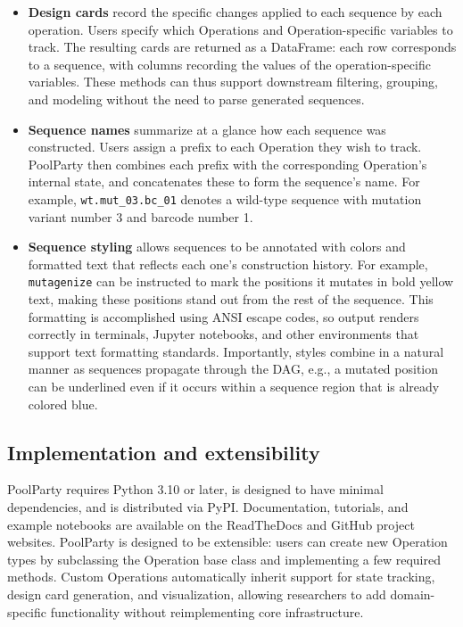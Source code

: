 \documentclass[unnumsec,webpdf,modern,large]{mam-authoring-template}%
\theoremstyle{thmstyleone}%
\theoremstyle{thmstyletwo}%
\theoremstyle{thmstylethree}%
\begin{document}
\begin{itemize}
\item \textbf{Design cards} record the specific changes applied to each sequence by each operation. Users specify which Operations and Operation-specific variables to track. The resulting cards are returned as a DataFrame: each row corresponds to a sequence, with columns recording the values of the operation-specific variables. These methods can thus support downstream filtering, grouping, and modeling without the need to parse generated sequences.

\item \textbf{Sequence names} summarize at a glance how each sequence was constructed. Users assign a prefix to each Operation they wish to track. PoolParty then combines each prefix with the corresponding Operation's internal state, and concatenates these to form the sequence's name. For example, \texttt{wt.mut\_03.bc\_01} denotes a wild-type sequence with mutation variant number 3 and barcode number 1.

\item \textbf{Sequence styling} allows sequences to be annotated with colors and formatted text that reflects each one's construction history. For example, \texttt{mutagenize} can be instructed to mark the positions it mutates in bold yellow text, making these positions stand out from the rest of the sequence. This formatting is accomplished using ANSI escape codes, so output renders correctly in terminals, Jupyter notebooks, and other environments that support text formatting standards. Importantly, styles combine in a natural manner as sequences propagate through the DAG, e.g., a mutated position can be underlined even if it occurs within a sequence region that is already colored blue.
\end{itemize}

\subsection{Implementation and extensibility}

PoolParty requires Python 3.10 or later, is designed to have minimal dependencies, and is distributed via PyPI. Documentation, tutorials, and example notebooks are available on the ReadTheDocs and GitHub project websites. PoolParty is designed to be extensible: users can create new Operation types by subclassing the Operation base class and implementing a few required methods. Custom Operations automatically inherit support for state tracking, design card generation, and visualization, allowing researchers to add domain-specific functionality without reimplementing core infrastructure.
\end{document}
